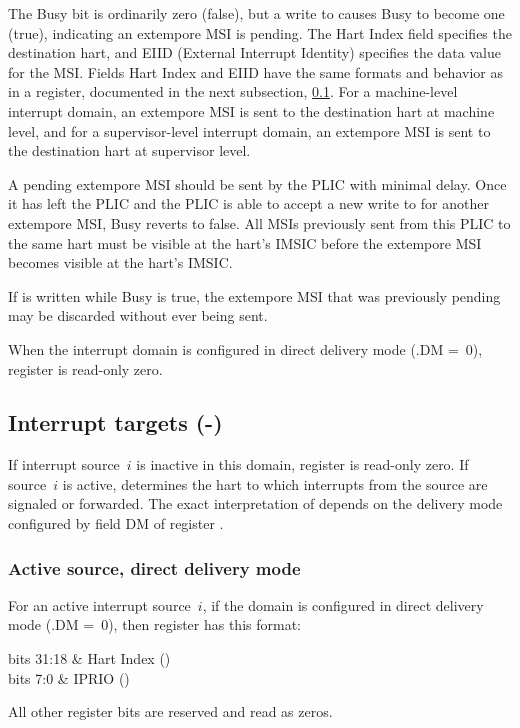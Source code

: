 The Busy bit is ordinarily zero (false), but a write to 
causes Busy to become one (true), indicating an extempore MSI is
pending.
The Hart Index field specifies the destination hart, and EIID
(External Interrupt Identity) specifies the data value for the MSI.
Fields Hart Index and EIID have the same formats and behavior
as in a  register, documented in the next subsection,
\ref{sec:AdvPLIC-reg-target}.
For a machine-level interrupt domain, an extempore MSI is sent to the
destination hart at machine level, and for a supervisor-level interrupt
domain, an extempore MSI is sent to the destination hart at supervisor
level.

A pending extempore MSI should be sent by the PLIC with minimal delay.
Once it has left the PLIC and the PLIC is able to accept a new write to
 for another extempore MSI, Busy reverts to false.
All MSIs previously sent from this PLIC to the same hart must be
visible at the hart's IMSIC before the extempore MSI becomes visible at
the hart's IMSIC.

If  is written while Busy is true, the extempore MSI that was
previously pending may be discarded without ever being sent.

When the interrupt domain is configured in direct delivery mode
(.DM =~0), register  is read-only zero.

\subsection{%
Interrupt targets (-)%
}
\label{sec:AdvPLIC-reg-target}

If interrupt source~$i$ is inactive in this domain, register
 is read-only zero.
If source~$i$ is active,  determines the hart to which
interrupts from the source are signaled or forwarded.
The exact interpretation of  depends on the delivery
mode configured by field DM of register .

\subsubsection*{Active source, direct delivery mode}

For an active interrupt source~$i$, if the domain is configured
in direct delivery mode (.DM =~0), then register
 has this format:\nopagebreak
\begin{displayLinesTable}[l@{\ \quad}l]
bits 31:18 & Hart Index (\WLRL) \\
bits 7:0   & IPRIO (\WARL) \\
\end{displayLinesTable}
All other register bits are reserved and read as zeros.

